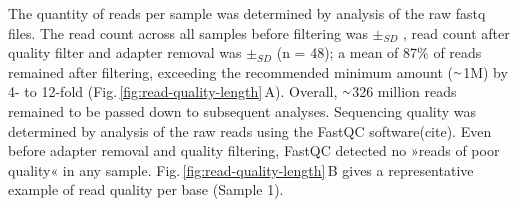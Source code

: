 \begin{method}
The quantity of reads per sample was determined by analysis of the raw fastq files. The read count across all samples before filtering was  $\pm_{SD}$ , read count after quality filter and adapter removal was  $\pm_{SD}$  (n = 48); a mean of 87\% of reads remained after filtering, exceeding the recommended minimum amount ($\smallsim$\num{1}M) by 4- to 12-fold (Fig.\,\ref{fig:read-quality-length}\,A). Overall, $\smallsim$326 million reads remained to be passed down to subsequent analyses. Sequencing quality was determined by analysis of the raw reads using the FastQC software(cite). Even before adapter removal and quality filtering, FastQC detected no »reads of poor quality« in any sample. Fig.\,\ref{fig:read-quality-length}\,B gives a representative example of read quality per base (Sample \num{1}).

\end{method}

